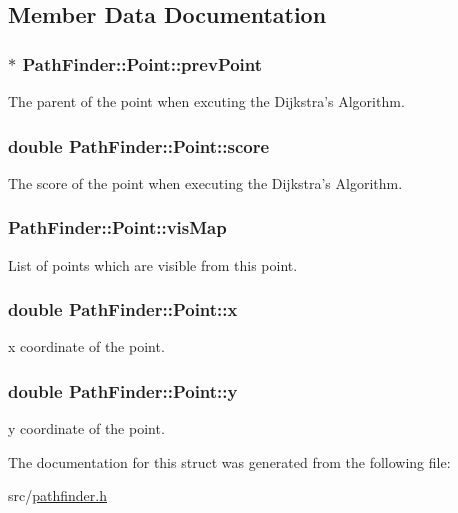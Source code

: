\subsection{Member Data Documentation}
\hypertarget{structPathFinder_1_1Point_a838fc3da5494344ab8fcdd5e6fea6173}{
\subsubsection[{prevPoint}]{$\ast$ {\bf PathFinder::Point::prevPoint}}}
\label{structPathFinder_1_1Point_a838fc3da5494344ab8fcdd5e6fea6173}
The parent of the point when excuting the Dijkstra's Algorithm. \hypertarget{structPathFinder_1_1Point_a56c732ebd9055f0f74fade3b63cfdd46}{
\subsubsection[{score}]{\setlength{\rightskip}{0pt plus 5cm}double {\bf PathFinder::Point::score}}}
\label{structPathFinder_1_1Point_a56c732ebd9055f0f74fade3b63cfdd46}
The score of the point when executing the Dijkstra's Algorithm. \hypertarget{structPathFinder_1_1Point_a8d0aee1e967e4a319b2cb78e116ec66f}{
\subsubsection[{visMap}]{ {\bf PathFinder::Point::visMap}}}
\label{structPathFinder_1_1Point_a8d0aee1e967e4a319b2cb78e116ec66f}
List of points which are visible from this point. \hypertarget{structPathFinder_1_1Point_a1be04f9eff0baa49c0e079f203c485f1}{
\subsubsection[{x}]{\setlength{\rightskip}{0pt plus 5cm}double {\bf PathFinder::Point::x}}}
\label{structPathFinder_1_1Point_a1be04f9eff0baa49c0e079f203c485f1}
x coordinate of the point. \hypertarget{structPathFinder_1_1Point_a4e29ec03f42f8c196500ed6482ff2c78}{
\subsubsection[{y}]{\setlength{\rightskip}{0pt plus 5cm}double {\bf PathFinder::Point::y}}}
\label{structPathFinder_1_1Point_a4e29ec03f42f8c196500ed6482ff2c78}
y coordinate of the point. 

The documentation for this struct was generated from the following file:\begin{DoxyCompactItemize}
\item 
src/\hyperlink{pathfinder_8h}{pathfinder.h}\end{DoxyCompactItemize}

